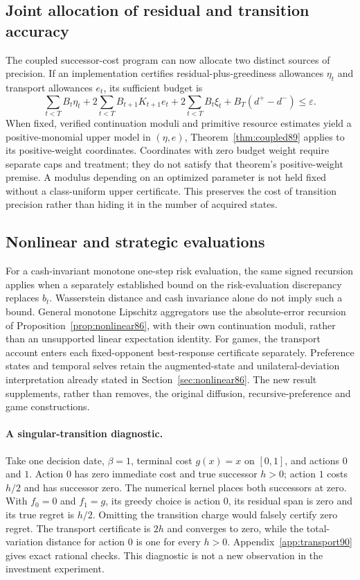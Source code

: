 \subsection{Joint allocation of residual and transition accuracy}
The coupled successor-cost program can now allocate two distinct sources of precision. If an implementation certifies residual-plus-greediness allowances $\eta_t$ and transport allowances $e_t$, its sufficient budget is
\begin{equation}\label{eq:joint-budget90}
 \sum_{t<T}B_t\eta_t+2\sum_{t<T}B_{t+1}K_{t+1}e_t
 +2\sum_{t<T}B_t\xi_t+B_T(d^+-d^-)\le\varepsilon.
\end{equation}
When fixed, verified continuation moduli and primitive resource estimates yield a positive-monomial upper model in $(\eta,e)$, Theorem~\ref{thm:coupled89} applies to its positive-weight coordinates. Coordinates with zero budget weight require separate caps and treatment; they do not satisfy that theorem's positive-weight premise. A modulus depending on an optimized parameter is not held fixed without a class-uniform upper certificate. This preserves the cost of transition precision rather than hiding it in the number of acquired states.

\subsection{Nonlinear and strategic evaluations}
For a cash-invariant monotone one-step risk evaluation, the same signed recursion applies when a separately established bound on the risk-evaluation discrepancy replaces $b_t$. Wasserstein distance and cash invariance alone do not imply such a bound. General monotone Lipschitz aggregators use the absolute-error recursion of Proposition~\ref{prop:nonlinear86}, with their own continuation moduli, rather than an unsupported linear expectation identity. For games, the transport account enters each fixed-opponent best-response certificate separately. Preference states and temporal selves retain the augmented-state and unilateral-deviation interpretation already stated in Section~\ref{sec:nonlinear86}. The new result supplements, rather than removes, the original diffusion, recursive-preference and game constructions.

\paragraph{A singular-transition diagnostic.}
Take one decision date, $\beta=1$, terminal cost $g(x)=x$ on $[0,1]$, and actions $0$ and $1$. Action $0$ has zero immediate cost and true successor $h>0$; action $1$ costs $h/2$ and has successor zero. The numerical kernel places both successors at zero. With $f_0=0$ and $f_1=g$, its greedy choice is action $0$, its residual span is zero and its true regret is $h/2$. Omitting the transition charge would falsely certify zero regret. The transport certificate is $2h$ and converges to zero, while the total-variation distance for action $0$ is one for every $h>0$. Appendix~\ref{app:transport90} gives exact rational checks. This diagnostic is not a new observation in the investment experiment.
